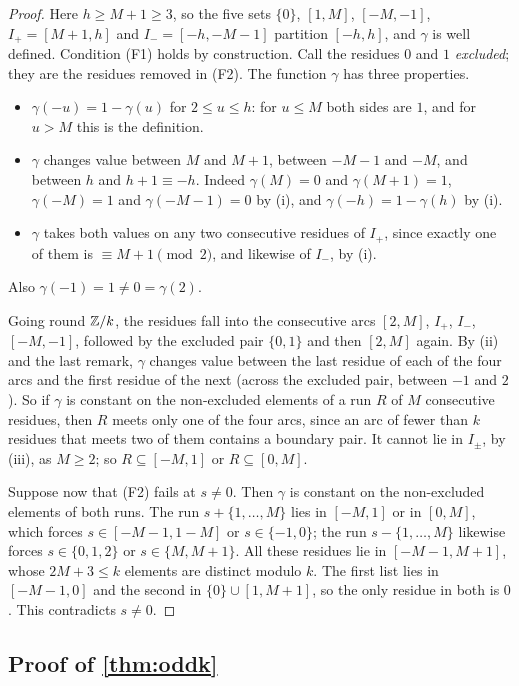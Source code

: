 \begin{proof}
Here $h\ge M+1\ge3$, so the five sets $\{0\}$, $[1,M]$, $[-M,-1]$,
$I_+=[M+1,h]$ and $I_-=[-h,-M-1]$ partition $[-h,h]$, and $\gamma$ is well
defined. Condition (F1) holds by construction. Call the residues $0$ and $1$
\emph{excluded}; they are the residues removed in (F2). The function $\gamma$
has three properties.
\begin{itemize}
\item[(i)] $\gamma(-u)=1-\gamma(u)$ for $2\le u\le h$: for $u\le M$ both
sides are $1$, and for $u>M$ this is the definition.
\item[(ii)] $\gamma$ changes value between $M$ and $M+1$, between $-M-1$ and
$-M$, and between $h$ and $h+1\equiv-h$. Indeed $\gamma(M)=0$ and
$\gamma(M+1)=1$, $\gamma(-M)=1$ and $\gamma(-M-1)=0$ by (i), and
$\gamma(-h)=1-\gamma(h)$ by (i).
\item[(iii)] $\gamma$ takes both values on any two consecutive residues of
$I_+$, since exactly one of them is $\equiv M+1\pmod 2$, and likewise of
$I_-$, by (i).
\end{itemize}
Also $\gamma(-1)=1\ne0=\gamma(2)$.

Going round $\mathbb{Z}/k$, the residues fall into the consecutive arcs $[2,M]$, $I_+$, $I_-$, $[-M,-1]$, followed by the excluded
pair $\{0,1\}$ and then $[2,M]$ again. By (ii) and the last remark, $\gamma$
changes value between the last residue of each of the four arcs and the
first residue of the next (across the excluded pair, between $-1$ and $2$).
So if $\gamma$ is constant on the non-excluded elements of a run $R$ of $M$
consecutive residues, then $R$ meets only one of the four arcs, since an
arc of fewer than $k$ residues that meets two of them contains a boundary
pair. It cannot lie in $I_\pm$, by (iii), as $M\ge2$; so $R\subseteq[-M,1]$
or $R\subseteq[0,M]$.

Suppose now that (F2) fails at $s\ne0$. Then $\gamma$ is constant on the
non-excluded elements of both runs. The run $s+\{1,\dots,M\}$ lies in
$[-M,1]$ or in $[0,M]$, which forces $s\in[-M-1,1-M]$ or $s\in\{-1,0\}$; the
run $s-\{1,\dots,M\}$ likewise forces $s\in\{0,1,2\}$ or $s\in\{M,M+1\}$.
All these residues lie in $[-M-1,M+1]$, whose $2M+3\le k$ elements are
distinct modulo $k$. The first list lies in $[-M-1,0]$ and the second in
$\{0\}\cup[1,M+1]$, so the only residue in both is $0$. This contradicts
$s\ne0$.
\end{proof}

\subsection{Proof of \autoref{thm:oddk}}
\label{sec:odd-proof}

